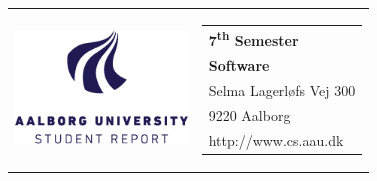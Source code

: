 \begin{titlepage}
    \setlength{\textwidth}{15cm}
    \noindent
    \begin{nopagebreak}
        {\samepage
            \begin{tabular}{lr}
                \parbox{0.40\textwidth}{\raisebox{11mm}
                    {\includegraphics[height=3cm]{img/aau-logo-english.png}}
                } &
                \parbox{0.4\textwidth}{
                    \small
                    \begin{tabular}{l}
                        {\sf\small \textbf{7\textsuperscript{th} Semester}}\\
                        {\sf\small \textbf{Software}}\\
                        {\sf\small Selma Lagerløfs Vej 300 } \\
                        {\sf\small 9220 Aalborg} \\
                        {\sf\small http://www.cs.aau.dk}
                    \end{tabular}
                }
            \end{tabular}

}
\end{nopagebreak}
\end{titlepage}
